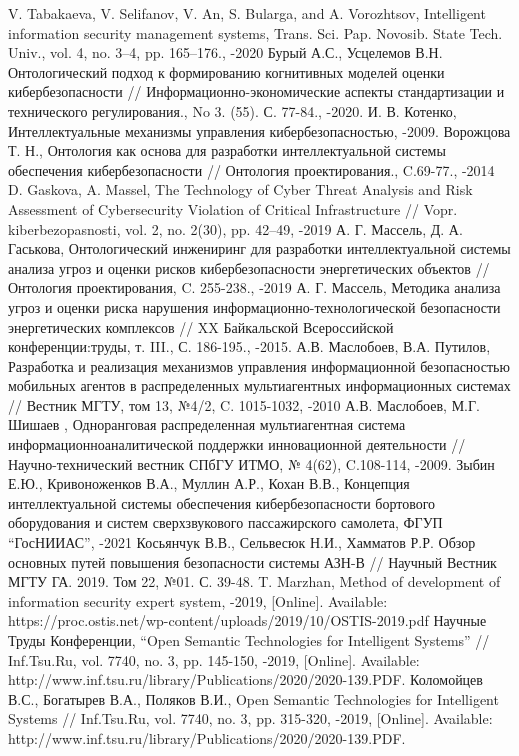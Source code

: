 \begin{thebibliography}{}
V. Tabakaeva, V. Selifanov, V. An, S. Bularga, and A. Vorozhtsov,
Intelligent information security management systems,  Trans. Sci. Pap. Novosib. State Tech. Univ., vol. 4,
no. 3–4, pp. 165–176., -2020
Бурый А.С., Усцелемов В.Н. Онтологический подход к формированию когнитивных моделей оценки
кибербезопасности // Информационно-экономические аспекты стандартизации и технического
регулирования.,  No 3. (55). С. 77-84., -2020.
И. В. Котенко, Интеллектуальные механизмы управления кибербезопасностью, -2009.
Ворожцова Т. Н., Онтология как основа для разработки интеллектуальной системы обеспечения
кибербезопасности // Онтология проектирования., C.69-77., -2014
D. Gaskova, A. Massel, The Technology of Cyber Threat Analysis and Risk Assessment of Cybersecurity
Violation of Critical Infrastructure // Vopr. kiberbezopasnosti, vol. 2, no. 2(30), pp. 42–49, -2019
А. Г. Массель, Д. А. Гаськова, Онтологический инжениринг для разработки интеллектуальной системы анализа угроз
и оценки рисков кибербезопасности энергетических объектов // Онтология проектирования, C. 255-238., -2019
А. Г. Массель, Методика анализа угроз и оценки риска нарушения информационно-технологической
безопасности энергетических комплексов // XX Байкальской Всероссийской конференции:труды,
т. III., С. 186-195., -2015.
А.В. Маслобоев, В.А. Путилов, Разработка и реализация механизмов управления информационной безопасностью
мобильных агентов в распределенных мультиагентных информационных системах // Вестник МГТУ, том 13, №4/2,
C. 1015-1032, -2010
А.В. Маслобоев, М.Г. Шишаев ,  Одноранговая распределенная мультиагентная система
информационноаналитической поддержки инновационной деятельности //
Научно-технический вестник СПбГУ ИТМО, № 4(62), C.108-114, -2009.
Зыбин Е.Ю., Кривоноженков В.А., Муллин А.Р., Кохан В.В., Концепция
интеллектуальной системы обеспечения кибербезопасности бортового оборудования
и систем сверхзвукового пассажирского самолета, ФГУП ``ГосНИИАС'', -2021
Косьянчук В.В., Сельвесюк Н.И., Хамматов Р.Р. Обзор основных путей повышения безопасности системы АЗН-В
// Научный Вестник МГТУ ГА. 2019. Том 22, №01. С. 39-48.
T. Marzhan, Method of development of information security expert system, -2019, [Online].
Available: https://proc.ostis.net/wp-content/uploads/2019/10/OSTIS-2019.pdf
Научные Труды Конференции, “Open Semantic Technologies for Intelligent Systems”
// Inf.Tsu.Ru, vol. 7740, no. 3, pp. 145-150, -2019,
[Online]. Available: http://www.inf.tsu.ru/library/Publications/2020/2020-139.PDF.
Коломойцев В.С., Богатырев В.А., Поляков В.И., Open Semantic Technologies for Intelligent Systems
// Inf.Tsu.Ru, vol. 7740, no. 3, pp. 315-320, -2019,
[Online]. Available: http://www.inf.tsu.ru/library/Publications/2020/2020-139.PDF.
\end{thebibliography}


